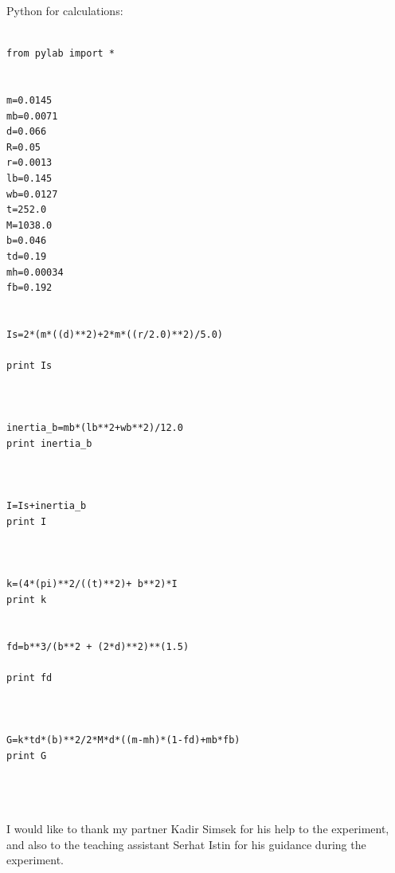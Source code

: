 \documentclass[aps,twocolumn,secnumarabic,nobalancelastpage,amsmath,amssymb,
nofootinbib]{revtex4}
\begin{document}
Python for calculations:

\begin{lstlisting}

from pylab import *


m=0.0145
mb=0.0071
d=0.066
R=0.05
r=0.0013
lb=0.145
wb=0.0127
t=252.0
M=1038.0
b=0.046
td=0.19
mh=0.00034
fb=0.192


Is=2*(m*((d)**2)+2*m*((r/2.0)**2)/5.0)

print Is



inertia_b=mb*(lb**2+wb**2)/12.0
print inertia_b



I=Is+inertia_b
print I



k=(4*(pi)**2/((t)**2)+ b**2)*I
print k


fd=b**3/(b**2 + (2*d)**2)**(1.5)

print fd



G=k*td*(b)**2/2*M*d*((m-mh)*(1-fd)+mb*fb)
print G




\end{lstlisting}




\begin{acknowledgments} 
I would like to thank my partner Kadir Simsek for his help to the experiment, and also to the teaching assistant Serhat Istin for his guidance during the experiment.

\end{acknowledgments}

\end{document}
